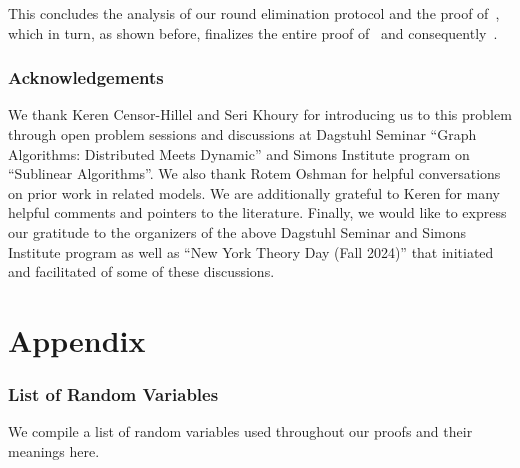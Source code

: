 \documentclass[11pt]{article}
\theoremstyle{definition}
\begin{document}
This concludes the analysis of our round elimination protocol and the proof of~, which in turn, as shown before, 
finalizes the entire proof of~ and consequently~. %

\bigskip
\section*{Acknowledgements} 

We thank Keren Censor-Hillel and Seri Khoury for introducing us to this problem through open problem sessions and discussions at 
Dagstuhl Seminar ``Graph Algorithms: Distributed Meets Dynamic'' and Simons Institute program on ``Sublinear Algorithms''. We also thank Rotem Oshman 
for helpful conversations on prior work in related models. We are additionally grateful to Keren for many helpful comments and pointers to the literature. Finally, 
we would like to express our gratitude to the organizers of the above Dagstuhl Seminar and Simons Institute program as well as ``New York Theory Day (Fall 2024)''
that initiated and facilitated of some of these discussions. 






\clearpage

\appendix

\part*{Appendix}

\renewcommand{\arraystretch}{1.5}

\section{List of Random Variables}\label{sec:list-rv}

We compile a list of random variables used throughout our proofs and their meanings here. 
\end{document}
